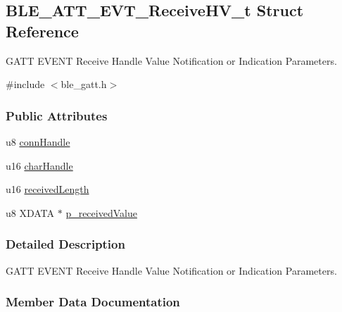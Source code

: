 \hypertarget{struct_b_l_e___a_t_t___e_v_t___receive_h_v__t}{}\subsection{B\+L\+E\+\_\+\+A\+T\+T\+\_\+\+E\+V\+T\+\_\+\+Receive\+H\+V\+\_\+t Struct Reference}
\label{struct_b_l_e___a_t_t___e_v_t___receive_h_v__t}


G\+A\+TT E\+V\+E\+NT Receive Handle Value Notification or Indication Parameters.  




{\ttfamily \#include $<$ble\+\_\+gatt.\+h$>$}

\subsubsection*{Public Attributes}
\begin{DoxyCompactItemize}
\item 
u8 \hyperlink{struct_b_l_e___a_t_t___e_v_t___receive_h_v__t_a3d5c141c81bf50f40979f196296c71a6}{conn\+Handle}
\item 
u16 \hyperlink{struct_b_l_e___a_t_t___e_v_t___receive_h_v__t_a9f1e62855434a5464b89ab57e3b3b292}{char\+Handle}
\item 
u16 \hyperlink{struct_b_l_e___a_t_t___e_v_t___receive_h_v__t_a8ca377a650674ef7edb5b690de7a22f4}{received\+Length}
\item 
u8 X\+D\+A\+TA $\ast$ \hyperlink{struct_b_l_e___a_t_t___e_v_t___receive_h_v__t_a9684fdd7b50e68f94550b72aae4a2dd2}{p\+\_\+received\+Value}
\end{DoxyCompactItemize}


\subsubsection{Detailed Description}
G\+A\+TT E\+V\+E\+NT Receive Handle Value Notification or Indication Parameters. 

\subsubsection{Member Data Documentation}
